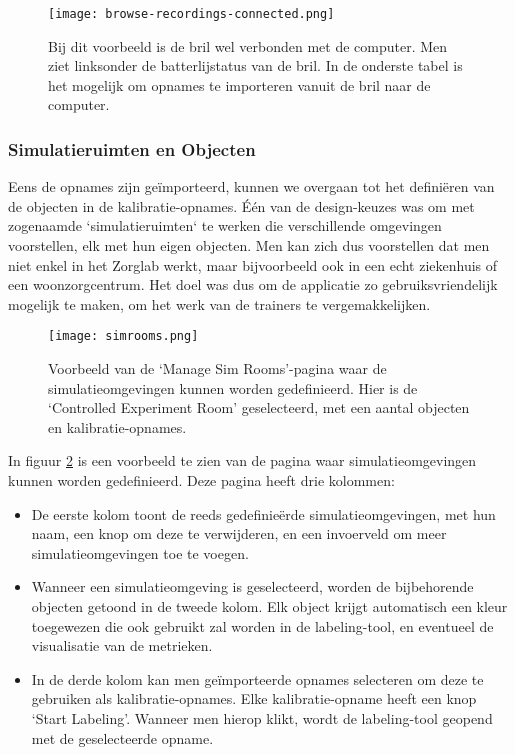 \begin{figure}[H]
  \centering
  \texttt{[image: browse-recordings-connected.png]}
  \caption[]{\label{fig:browse-recordings-connected} Bij dit voorbeeld is de bril wel verbonden met de computer. Men ziet linksonder de batterlijstatus van de bril. In de onderste tabel is het mogelijk om opnames te importeren vanuit de bril naar de computer. }
\end{figure}

\subsubsection{Simulatieruimten en Objecten}

Eens de opnames zijn geïmporteerd, kunnen we overgaan tot het definiëren van de objecten in de kalibratie-opnames. Één van de design-keuzes was om met zogenaamde `simulatieruimten` te werken die verschillende omgevingen voorstellen, elk met hun eigen objecten.
Men kan zich dus voorstellen dat men niet enkel in het Zorglab werkt, maar bijvoorbeeld ook in een echt ziekenhuis of een woonzorgcentrum. Het doel was dus om de applicatie zo gebruiksvriendelijk mogelijk te maken, om het werk van de trainers te vergemakkelijken.

\begin{figure}[H]
  \centering
  \texttt{[image: simrooms.png]}
  \caption[]{\label{fig:simrooms} Voorbeeld van de `Manage Sim Rooms'-pagina waar de simulatieomgevingen kunnen worden gedefinieerd. Hier is de `Controlled Experiment Room' geselecteerd, met een aantal objecten en kalibratie-opnames. }
\end{figure}

In figuur \ref{fig:simrooms} is een voorbeeld te zien van de pagina waar simulatieomgevingen kunnen worden gedefinieerd. 
Deze pagina heeft drie kolommen:
\begin{itemize}
    \item De eerste kolom toont de reeds gedefinieërde simulatieomgevingen, met hun naam, een knop om deze te verwijderen, en een invoerveld om meer simulatieomgevingen toe te voegen.
    \item Wanneer een simulatieomgeving is geselecteerd, worden de bijbehorende objecten getoond in de tweede kolom. Elk object krijgt automatisch een kleur toegewezen die ook gebruikt zal worden in de labeling-tool, en eventueel de visualisatie van de metrieken.
    \item In de derde kolom kan men geïmporteerde opnames selecteren om deze te gebruiken als kalibratie-opnames. Elke kalibratie-opname heeft een knop `Start Labeling'. Wanneer men hierop klikt, wordt de labeling-tool geopend met de geselecteerde opname.
\end{itemize}

